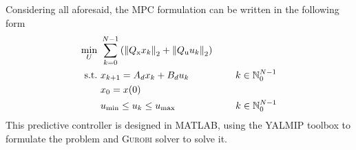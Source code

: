 Considering all aforesaid, the MPC formulation can be written in the following form
\begin{subequations}\label{mpc:linear}
	\begin{align}
	\min_{U}\ &\sum_{k=0}^{N-1} \left( \left\| Q _{\text{x}}x_{k}\right\|_2+\left\|Q _{\text{u}}u_{k}\right\|_2 \right)\\
	\text{s.t.}\ &x_{k+1} = A_dx_{k} + B_du_{k}\qquad\qquad\ \ \,  k \in \mathbb{N}_0^{N-1}\\
	&x_0 = x(0)\\
	&u _{\text{min}}\leq u_{k}\leq u _{\text{max}}\qquad\qquad\qquad\;   k \in \mathbb{N}_0^{N-1}
	\end{align}
\end{subequations}
This predictive controller is designed in \textsc{MATLAB}, using the \textsc{YALMIP} toolbox \cite{YALMIP} to formulate the problem and \textsc{Gurobi} solver to solve it.
